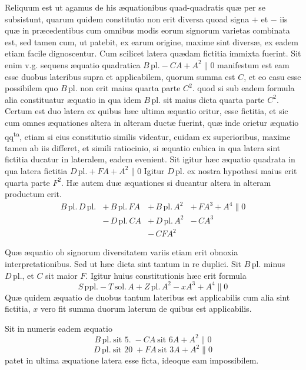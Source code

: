 \documentclass[11pt,a4paper]{article}
\begin{document}
Reliquum est ut agamus de his æquationibus quad-quadratis quæ per se subsistunt, quarum quidem constitutio non erit diversa quoad signa $+$ et $-$ iis quæ in præcedentibus cum omnibus modis eorum signorum varietas combinata est, sed tamen cum, ut patebit, ex earum origine, maxime sint diversæ, ex eadem etiam facile dignoscentur. Cum scilicet latera quædam fictitia immixta fuerint. Sit enim v.g. sequens æquatio quadratica $B\,\mathrm{pl.} - C A + A^2 \parallel 0$ manifestum est eam esse duobus lateribus supra et applicabilem, quorum summa est $C$, et eo casu esse possibilem quo $B\,\mathrm{pl.}$ non erit maius quarta parte $C^2$. quod si sub eadem formula alia constituatur æquatio in qua idem $B\,\mathrm{pl.}$ sit maius dicta quarta parte $C^2$. Certum est duo latera ex quibus hæc ultima æquatio oritur, esse fictitia, et sic cum omnes æquationes altera in alteram ductæ fuerint, quæ inde orietur æquatio qq\textsuperscript{ta}, etiam si eius constitutio similis videatur, cuidam ex superioribus, maxime tamen ab iis differet, et simili ratiocinio, si æquatio cubica in qua latera sint fictitia ducatur in lateralem, eadem evenient. Sit igitur hæc æquatio quadrata in qua latera fictitia $D\,\mathrm{pl.} + F A + A^2 \parallel 0$ Igitur $D\,\mathrm{pl.}$ ex nostra hypothesi maius erit quarta parte $F^2$. Hæ autem duæ æquationes si ducantur altera in alteram productum erit.
\[
\begin{array}{llll}
B\,\mathrm{pl.}\,D\,\mathrm{pl.} & +\,B\,\mathrm{pl.}\,F A & +\,B\,\mathrm{pl.}\,A^2 & +\,F A^3 + A^4 \parallel 0\\[2pt]
 & -\,D\,\mathrm{pl.}\,C A & +\,D\,\mathrm{pl.}\,A^2 & -\,C A^3\\[2pt]
 & & -\,C F A^2 &
\end{array}
\]

Quæ æquatio ob signorum diversitatem variis etiam erit obnoxia interpretationibus. Sed ut hæc dicta sint tantum in re duplici. Sit $B\,\mathrm{pl.}$ minus $D\,\mathrm{pl.}$, et $C$ sit maior $F$. Igitur huius constitutionis hæc erit formula
\[ S\,\mathrm{ppl.} - T\,\mathrm{sol.}\,A + Z\,\mathrm{pl.}\,A^2 - x A^3 + A^4 \parallel 0 \]
Quæ quidem æquatio de duobus tantum lateribus est applicabilis cum alia sint fictitia, $x$ vero fit summa duorum laterum de quibus est applicabilis.

Sit in numeris eadem æquatio
\[ B\,\mathrm{pl.}\ \text{sit } 5. \; - C A \ \text{sit } 6 A + A^2 \parallel 0 \]
\[ D\,\mathrm{pl.}\ \text{sit } 20 \; + F A \ \text{sit } 3 A + A^2 \parallel 0 \]
patet in ultima æquatione latera esse ficta, ideoque eam impossibilem.
\end{document}
